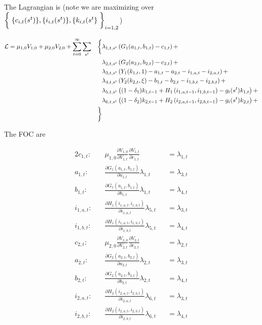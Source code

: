 \documentclass[10pt]{article}
\newcommand{\fracpd}[2]{
  \ensuremath{\frac{\partial #1}{\partial #2}}
}
\begin{document}
The Lagrangian is (note we are maximizing over $\biggm\{ \{c_{i, t}(s^t) \}, \{i_{i, t}(s^t)\}, \{k_{i, t}(s^t\} \biggm\}_{i=1, 2}$)

\begin{alignat}{2} \label{eq:lagrangian}
  \mathcal{L} &= \mu_{1,0} V_{1,0} + \mu_{2,0} V_{2,0} + \sum_{t=0}^{\infty} \sum_{s^t} & \biggm \{
  &\lambda_{1, t, s^t} \left( G_1(a_{1,t}, b_{1,t}) - c_{1,t} \right) + \notag \\
  & & &\lambda_{2, t, s^t} \left( G_2(a_{2,t}, b_{2,t}) - c_{2,t} \right) + \notag \\
  & & &\lambda_{3, t, s^t} \left( Y_1(k_{1,t},1) - a_{1,t} - a_{2,t} - i_{1,a,t} - i_{2,a,t} \right) + \notag \\
  & & &\lambda_{4, t, s^t} \left( Y_2(k_{2,t}, \xi) - b_{1,t} - b_{2,t} - i_{1,b,t} - i_{2,b,t} \right) + \notag \\
  & & &\lambda_{5, t, s^t} \left( (1-\delta_1)k_{1,t-1} + H_1 \left(i_{1,a,t-1}, i_{1,b,t-1} \right) - g_{t}(s^t) k_{1,t} \right) + \notag \\
  & & &\lambda_{6, t, s^t} \left( (1-\delta_2)k_{2,t-1} + H_2 \left(i_{2,a,t-1}, i_{2,b,t-1} \right) - g_{t}(s^t) k_{2,t} \right) + \notag \\
   && \biggm\}
\end{alignat}

The FOC are

\begin{alignat}{2}
  c_{1,t} : \quad   & \mu_{1,0} \fracpd{V_{1,0}}{V_{1,t}} \fracpd{V_{1,t}}{c_{1,t}} & &= \lambda_{1,t} \label{eq:c1} \\
  a_{1,t} : \quad   & \fracpd{G_1(a_{1,t}, b_{1,t})}{a_{1,t}} \lambda_{1,t} & &= \lambda_{3,t} \label{eq:a1} \\
  b_{1,t} : \quad   & \fracpd{G_1(a_{1,t}, b_{1,t})}{b_{1,t}} \lambda_{1,t} & &= \lambda_{4,t} \label{eq:b1} \\
  i_{1,a,t} : \quad & \fracpd{H_1(i_{1,a,t}, i_{1,b,t})}{i_{1,a,t}} \lambda_{5,t} & &= \lambda_{3,t} \label{eq:i1a} \\
  i_{1,b,t} : \quad & \fracpd{H_1(i_{1,a,t}, i_{1,b,t})}{i_{1,b,t}} \lambda_{5,t} & &= \lambda_{4,t} \label{eq:i1b} \\
  c_{2,t} : \quad   & \mu_{2,0} \fracpd{V_{2,0}}{V_{2,t}} \fracpd{V_{2,t}}{c_{2,t}}  & &= \lambda_{2,t} \label{eq:c2} \\
  a_{2,t} : \quad   & \fracpd{G_2(a_{2,t}, b_{2,t})}{a_{2,t}} \lambda_{2,t} & &= \lambda_{3,t} \label{eq:a2} \\
  b_{2,t} : \quad   & \fracpd{G_2(a_{2,t}, b_{2,t})}{b_{2,t}} \lambda_{2,t} & &= \lambda_{4,t} \label{eq:b2} \\
  i_{2,a,t} : \quad & \fracpd{H_2(i_{2,a,t}, i_{2,b,t})}{i_{2,a,t}} \lambda_{6,t} & &= \lambda_{3,t} \label{eq:i2a} \\
  i_{2,b,t} : \quad & \fracpd{H_2(i_{2,a,t}, i_{2,b,t})}{i_{2,b,t}} \lambda_{6,t} & &= \lambda_{4,t} \label{eq:i2b}
\end{alignat}
\end{document}
